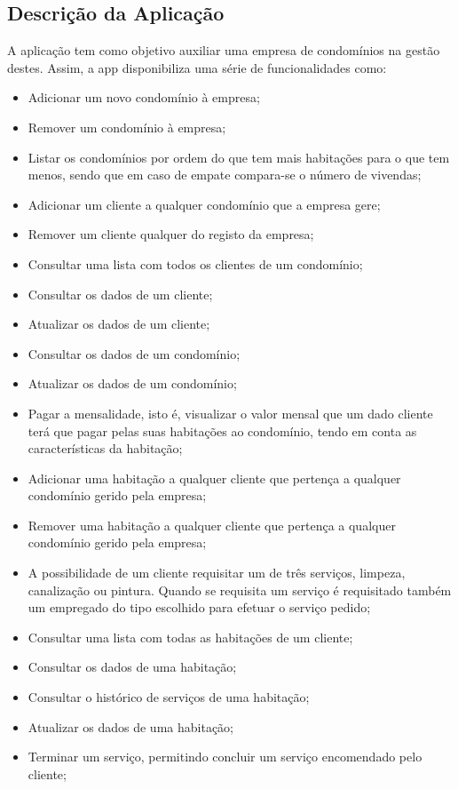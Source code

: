 \documentclass[a4paper]{article}
\begin{document}
\subsection{Descrição da Aplicação}

A aplicação tem como objetivo auxiliar uma empresa de condomínios na gestão destes. Assim, a app disponibiliza uma série de funcionalidades como:

\begin{itemize}
	\item Adicionar um novo condomínio à empresa;
	\item Remover um condomínio à empresa;
	\item Listar os condomínios por ordem do que tem mais habitações para o que tem menos, sendo que em caso de empate compara-se o número de vivendas;
	\item Adicionar um cliente a qualquer condomínio que a empresa gere;
	\item Remover um cliente qualquer do registo da empresa;	
	\item Consultar uma lista com todos os clientes de um condomínio;
	\item Consultar os dados de um cliente;
	\item Atualizar os dados de um cliente;
	\item Consultar os dados de um condomínio;
	\item Atualizar os dados de um condomínio;
	\item Pagar a mensalidade, isto é, visualizar o valor mensal que um dado cliente terá que pagar pelas suas habitações ao condomínio, tendo em conta as características da habitação;
	\item Adicionar uma habitação a qualquer cliente que pertença a qualquer condomínio gerido pela empresa;
	\item	Remover uma habitação a qualquer cliente que pertença a qualquer condomínio gerido pela empresa;
	\item A possibilidade de um cliente requisitar um de três serviços, limpeza, canalização ou pintura. Quando se requisita um serviço é requisitado também um empregado do tipo escolhido para efetuar o serviço pedido;
	\item Consultar uma lista com todas as habitações de um cliente;
	\item Consultar os dados de uma habitação;
	\item Consultar o histórico de serviços de uma habitação;
	\item Atualizar os dados de uma habitação;
	\item Terminar um serviço, permitindo concluir um serviço encomendado pelo cliente;
\end{itemize}
\end{document}
